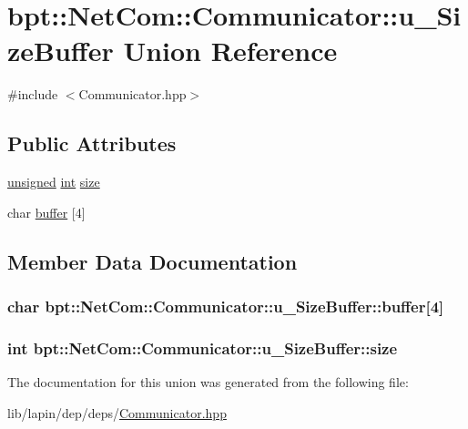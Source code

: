 \hypertarget{unionbpt_1_1_net_com_1_1_communicator_1_1u___size_buffer}{\section{bpt\-:\-:Net\-Com\-:\-:Communicator\-:\-:u\-\_\-\-Size\-Buffer Union Reference}
\label{unionbpt_1_1_net_com_1_1_communicator_1_1u___size_buffer}
}


{\ttfamily \#include $<$Communicator.\-hpp$>$}

\subsection*{Public Attributes}
\begin{DoxyCompactItemize}
\item 
\hyperlink{curses_8priv_8h_aca40206900cfc164654362fa8d4ad1e6}{unsigned} \hyperlink{term__entry_8h_ad65b480f8c8270356b45a9890f6499ae}{int} \hyperlink{unionbpt_1_1_net_com_1_1_communicator_1_1u___size_buffer_ab968a5f33e389666d48959a1ff7dcb97}{size}
\item 
char \hyperlink{unionbpt_1_1_net_com_1_1_communicator_1_1u___size_buffer_a2d68a650de2ee62a62a81f0fe6334973}{buffer} \mbox{[}4\mbox{]}
\end{DoxyCompactItemize}


\subsection{Member Data Documentation}
\hypertarget{unionbpt_1_1_net_com_1_1_communicator_1_1u___size_buffer_a2d68a650de2ee62a62a81f0fe6334973}{
\subsubsection[{buffer}]{\setlength{\rightskip}{0pt plus 5cm}char bpt\-::\-Net\-Com\-::\-Communicator\-::u\-\_\-\-Size\-Buffer\-::buffer\mbox{[}4\mbox{]}}}\label{unionbpt_1_1_net_com_1_1_communicator_1_1u___size_buffer_a2d68a650de2ee62a62a81f0fe6334973}
\hypertarget{unionbpt_1_1_net_com_1_1_communicator_1_1u___size_buffer_ab968a5f33e389666d48959a1ff7dcb97}{
\subsubsection[{size}]{ {\bf int} bpt\-::\-Net\-Com\-::\-Communicator\-::u\-\_\-\-Size\-Buffer\-::size}}\label{unionbpt_1_1_net_com_1_1_communicator_1_1u___size_buffer_ab968a5f33e389666d48959a1ff7dcb97}


The documentation for this union was generated from the following file\-:\begin{DoxyCompactItemize}
\item 
lib/lapin/dep/deps/\hyperlink{_communicator_8hpp}{Communicator.\-hpp}\end{DoxyCompactItemize}
